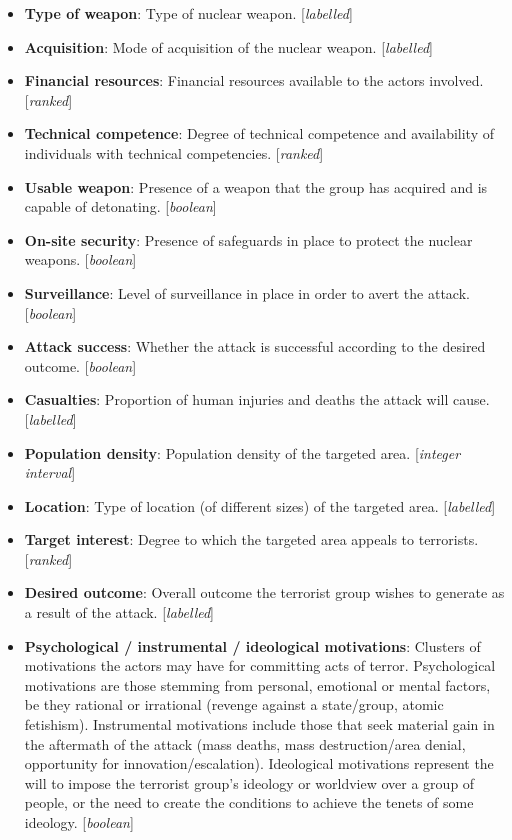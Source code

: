 \documentclass{article}
\begin{document}
{\begin{itemize}
    \item \textbf{Type of weapon}: Type of nuclear weapon. [\textit{labelled}] 

    \item \textbf{Acquisition}: Mode of acquisition of the nuclear weapon. [\textit{labelled}]

    \item \textbf{Financial resources}: Financial resources available to the actors involved. [\textit{ranked}]

    \item \textbf{Technical competence}: Degree of technical competence and availability of individuals with technical competencies. [\textit{ranked}]

    \item \textbf{Usable weapon}: Presence of a weapon that the group has acquired and is capable of detonating. [\textit{boolean}]

    \item \textbf{On-site security}: Presence of safeguards in place to protect the nuclear weapons. [\textit{boolean}]

    \item \textbf{Surveillance}: Level of surveillance in place in order to avert the attack. [\textit{boolean}]

    \item \textbf{Attack success}: Whether the attack is successful according to the desired outcome. [\textit{boolean}]

    \item \textbf{Casualties}: Proportion of human injuries and deaths the attack will cause. [\textit{labelled}]
    
    \item \textbf{Population density}: Population density of the targeted area. [\textit{integer interval}] 

    \item \textbf{Location}: Type of location (of different sizes) of the targeted area. [\textit{labelled}]
    
    \item \textbf{Target interest}: Degree to which the targeted area appeals to terrorists. [\textit{ranked}]

    \item \textbf{Desired outcome}: Overall outcome the terrorist group wishes to generate as a result of the attack. [\textit{labelled}]  

    \item \textbf{Psychological / instrumental / ideological motivations}: Clusters of motivations the actors may have for committing acts of terror. Psychological motivations are those stemming from personal, emotional or mental factors, be they rational or irrational (revenge against a state/group, atomic fetishism). Instrumental motivations include those that seek material gain in the aftermath of the attack (mass deaths, mass destruction/area denial, opportunity for innovation/escalation). Ideological motivations represent the will to impose the terrorist group’s ideology or worldview over a group of people, or the need to create the conditions to achieve the tenets of some ideology. [\textit{boolean}]
\end{itemize}
}
\end{document}

